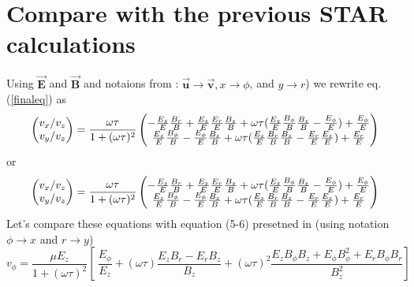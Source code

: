 \documentclass[12pt]{article} %
\begin{document}
\section{Compare with the previous  STAR calculations\cite{Gene}}
Using $\overrightarrow{\mathbf{E}}$ and $\overrightarrow{\mathbf{B}}$
and notaions from \cite{Gene} : $\overrightarrow{\mathbf{u}} \rightarrow \overrightarrow{\mathbf{v}} , x \rightarrow \phi$, and $y \rightarrow r$)
we rewrite eq. (\ref{finaleq}) as 
\begin{equation}
\begin{pmatrix}
{v_{x}}/{v_{z}} \cr
{v_{y}}/{v_{z}} \cr
\end{pmatrix}
=
\frac{\omega \tau }{1 + (\omega \tau )^2}
\begin{pmatrix}
 - \frac{E_{z}}{E} \frac{B_{r}}{B} + \frac{E_{z}}{E} \frac{E_{r}}{E} \frac{B_{z}}{B} + \omega \tau (\frac{E_{z}}{E} \frac{B_{\phi}}{B} \frac{B_{z}}{B} - \frac{E_{\phi}}{E}       ) + \frac{E_{\phi}}{E} \cr
   \frac{E_{z}}{E} \frac{B_{\phi}}{B} -       \frac{E_{\phi}}{E} \frac{B_{z}}{B} + \omega \tau (\frac{E_{z}}{E} \frac{B_{r}}{B} \frac{B_{z}}{B} - \frac{E_{r}}{E} \frac{E_{z}}{E} ) + \frac{E_{r}}{E} \cr 
\end{pmatrix}
\end{equation}
or 
\begin{equation}
\begin{pmatrix}
{v_{x}}/{v_{z}} \cr
{v_{y}}/{v_{z}} \cr
\end{pmatrix}
=
\frac{\omega \tau }{1 + (\omega \tau )^2}
\begin{pmatrix}
 - \frac{E_{z}}{E} \frac{B_{r}}{B} + \frac{E_{z}}{E} \frac{E_{r}}{E} \frac{B_{z}}{B} + \omega \tau (\frac{E_{z}}{E} \frac{B_{\phi}}{B} \frac{B_{z}}{B} - \frac{E_{\phi}}{E}       ) + \frac{E_{\phi}}{E} \cr
   \frac{E_{z}}{E} \frac{B_{\phi}}{B} -       \frac{E_{\phi}}{E} \frac{B_{z}}{B} + \omega \tau (\frac{E_{z}}{E} \frac{B_{r}}{B} \frac{B_{z}}{B} - \frac{E_{r}}{E} \frac{E_{z}}{E} ) + \frac{E_{r}}{E} \cr 
\end{pmatrix}
\end{equation}
Let's compare these equations with equation (5-6) presetned in \cite{Gene} (using notation $\phi \rightarrow x$ and $r \rightarrow y$)
\begin{equation}
v_{\phi} = \frac{\mu E_{z}}{1 + (\omega \tau)^2}
\left[ \
\frac{ E_{\phi} }{ E_{z}} + (\omega \tau )     \frac{E_{z} B_{r}          - E_{r} B_{z}                                 }{B_{z}}
                          + (\omega \tau )^{2} \frac{E_{z} B_{\phi} B_{z} + E_{\phi} B_{\phi}^{2} + E_{r} B_{\phi} B_{r}}{B_{z}^{2}} 
\right]
\end{equation}
\end{document}
